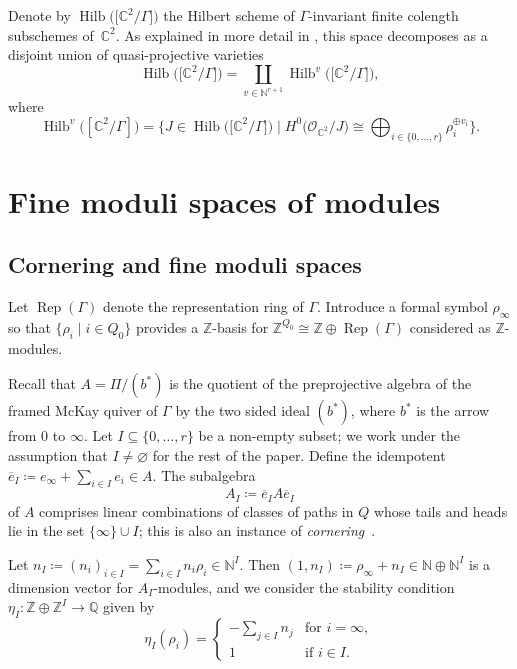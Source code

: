 \documentclass[11pt]{article}
\numberwithin{equation}{section}
\newcommand{\SC}{\mathbb{C}} %
\newcommand{\Rep}{\operatorname{Rep}}
\newcommand{\PiQ}{A}
\DeclareMathOperator{\Hilb}{\mathrm{Hilb}}
\numberwithin{equation}{section}
\begin{document}
\setcounter{section}{3}\setcounter{subsection}{2}
 Denote by $\Hilb\big(\big[\SC^2/\Gamma\big]\big)$ the Hilbert scheme of $\Gamma$-invariant finite colength subschemes of~$\SC^2$. As explained in more detail in \cite[Section~1.1]{gyenge2018euler}, this space decomposes as a disjoint union of quasi-projective varieties
\[\Hilb\big(\big[\SC^2/\Gamma\big]\big) = \coprod_{v\in \mathbb{N}^{r+1}}\Hilb^v\big(\big[\SC^2/\Gamma\big]\big),
\]
where \[\Hilb^v\big([\SC^2/\Gamma]\big) =\Big\{J\in \Hilb\big(\big[\SC^2/\Gamma\big]\big)\mid H^0\big(\mathcal{O}_{\SC^2}/J\big) \cong \bigoplus_{i\in \{0, \dots, r\}} \rho_i^{\oplus v_i}\Big\}.\]


\section{Fine moduli spaces of modules}
\label{subsec:finemod}

\subsection{Cornering and fine moduli spaces}

Let $\Rep(\Gamma)$
denote the representation ring of $\Gamma$. Introduce a formal symbol $\rho_{\infty}$ so that $\{\rho_i \mid i \in Q_0\}$ provides a $\mathbb{Z}$-basis for $\mathbb{Z}^{Q_0}\cong \mathbb{Z}\oplus \Rep(\Gamma)$ considered as $\mathbb{Z}$-modules.

Recall that $\PiQ=\Pi/(b^{\ast})$ is the quotient of the
preprojective algebra of the framed McKay quiver of $\Gamma$ by the two sided ideal $(b^{\ast})$, where $b^\ast$ is the arrow from $0$ to $\infty$.
Let $I \subseteq \{0, \dots , r\}$ be a non-empty subset; we work under the assumption that $I\ne \varnothing$ for the rest of the paper.
Define the idempotent $\overline{e}_I \coloneqq e_{\infty} + \sum_{i \in I} e_i \in \PiQ$.
The subalgebra
\begin{equation}\label{eqn:AI}
\PiQ_I \coloneqq \overline{e}_I \PiQ \overline{e}_I
\end{equation}
of $A$ comprises linear combinations of
classes of paths in $Q$ whose tails and heads lie in the set $\{\infty\} \cup I$; this is also an instance of \emph{cornering}~\cite[Remark~3.1]{craw2018multigraded}.

Let
$n_I \coloneqq {(n_i)_{i\in I}}= \sum_{i \in I} n_i \rho_i \in \mathbb{N}^{I}$.
Then $(1,n_I)\coloneqq\rho_{\infty} +n_I \in \mathbb{N} \oplus \mathbb{N}^{I}$
is a dimension vector for $\PiQ_I$-modules, and we consider the stability condition $\eta_{I}\colon \mathbb{Z} \oplus \mathbb{Z}^{I} \to \mathbb{Q}$
given by
\begin{equation}
 \label{eqn:etaI}
\eta_I (\rho_i) =
\begin{cases}
\displaystyle -\sum_{j \in I} n_j & \textrm{for } i= \infty, \\
1 & \textrm{if }i \in I.
\end{cases}
\end{equation}
\end{document}
